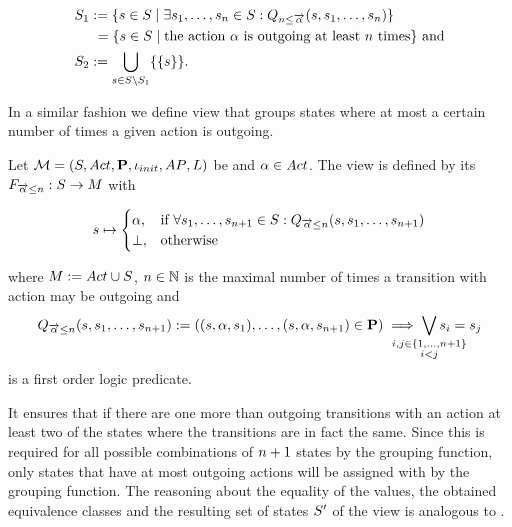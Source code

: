 \documentclass[preview]{standalone}
\begin{document}
\begin{align*}
	\states_1 &:= \{\state \in \states \mid \exists \state_1, \dots, \state_\numoutact \in \states: \predminoutact\} \\ %
	&\hspace{1.15mm}= \{\state \in \states \mid \text{the action } \action \text{ is outgoing at least } \numoutact \text{ times} \} \text{ and} \\
	\states_2 &:= \remstates.	
\end{align*}

In a similar fashion we define view that groups states where at most a certain number of times a given action is outgoing. 

\begin{definition}
	Let ${{{\mathcal{M}}}} = {{({S}, {Act}, {\textbf{P}}, {\iota_{init}}, {AP}, {L})}}$ be \chosengraphtypeN and ${\alpha} \in {Act}$. The view \viewmaxoutaction is defined by its \grpfctN ${{F_{{\overrightarrow{{\alpha}}}\leq{n}}}} : {S} \to {M}$ with
	
	\[
	{s} \mapsto
	\begin{cases}
		{\alpha},				& \text{if } \forall {s}_1, \dots, {s}_{{n}+1} \in {S}: {Q_{{\overrightarrow{{\alpha}}}\leq{n}}({s},{s}_1, \dots, {s}_{{n}+1})} \\
		{\bot},          	& \text{otherwise}
	\end{cases}
	\]
	
	where ${{M}} := {Act} \cup {\ensuremath{{S}}}$, ${n} \in {\mathbb{N}}$ is the maximal number of times a transition with action \action may be outgoing and 
	\[
	\predmaxoutact := ((\state, \action, \state_1), \dots, (\state, \action, \state_{\numoutact+1}) \in \trans) \implies \bigvee_{\mathclap{\substack{i,j \in \{1,\dots, \numoutact+1\} \\ i < j}}} \state_i = \state_j
	\]
	is a first order logic predicate.
	\label{def:viewmaxoutaction}
\end{definition}

 It ensures that if there are one more than \numoutact outgoing transitions with an action \action at least two of the states where the transitions  are in fact the same. Since this is required for all possible combinations of ${n} + 1$ states by the grouping function, only states that have at most \numoutact outgoing actions will be assigned with \action by the grouping function. The reasoning about the equality of the \grpfctN values, the obtained equivalence classes and the resulting set of states ${S}'$ of the view is analogous to \viewminoutaction.
\end{document}
